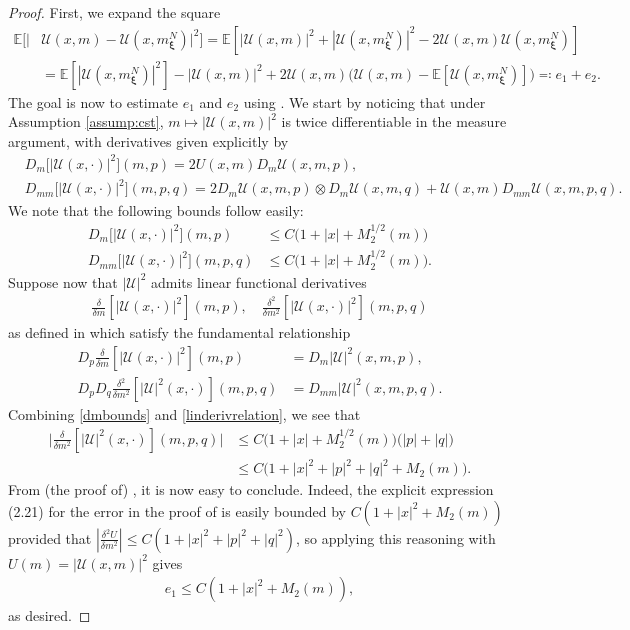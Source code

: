\documentclass[11pt,reqno]{amsart}
\numberwithin{equation}{section}
\theoremstyle{definition}
\def\E{{\mathbb E}}
\newcommand\cU{\mathcal U}
\def \E{\mathbb{E}}
\begin{document}
\begin{proof}
First, we expand the square
\begin{align*}
\E[|& \cU(x,m) - \cU(x,m_{\bm \xi}^N)|^2] = \E[ |\cU(x,m)|^2 + |\cU(x,m_{\bm \xi}^N)|^2 - 2 \cU(x,m) \cU(x,m_{\bm \xi}^N) ] \\
&=  \E[|\cU(x, m_{\bm \xi}^N)|^2] - | \cU(x,m)|^2 + 2\cU(x,m) \big(\cU(x,m) - \E[\cU(x,m_{\bm \xi}^N)] \big) \eqqcolon e_1 + e_2.
\end{align*}
The goal is now to estimate $e_1$ and $e_2$ using \cite[Theorem 2.11]{CST}. 
We start by noticing that under Assumption \ref{assump:cst}, $m \mapsto |\cU(x,m)|^2$ is twice differentiable in the measure argument, with derivatives given explicitly by
\begin{align} \label{derivsquare}
&D_m \big[ |\cU(x,\cdot)|^2\big] (m,p) = 2 U(x,m) D_m \cU(x,m,p), \nonumber \\
&D_{mm} \big[ |\cU(x,\cdot)|^2 \big] (m,p,q) = 2 D_m \cU(x,m,p) \otimes D_m \cU(x,m,q) + \cU(x,m) D_{mm} \cU(x, m,p,q). 
\end{align}
We note that the following bounds follow easily:
\begin{align} \label{dmbounds}
D_m \big[ |\cU(x,\cdot)|^2\big] (m,p) &\leq C\big(1 + |x| + M_2^{1/2}(m)\big) \nonumber \\
D_{mm} \big[ | \cU(x,\cdot)|^2 \big] (m,p,q) &\leq C\big(1 + |x| + M_2^{1/2}(m)\big).
\end{align}
 Suppose now that $|\cU|^2$ admits linear functional derivatives
\begin{align*}
\frac{\delta}{\delta m}[|\cU(x, \cdot)|^2](m,p), \quad \frac{\delta^2}{\delta m^2}[| \cU(x, \cdot)|^2](m,p,q)
\end{align*}
as defined in \cite{CST} which satisfy the fundamental relationship
\begin{align} \label{linderivrelation}
D_p \frac{\delta}{\delta m}[|\cU(x, \cdot)|^2](m,p) &= D_m |\cU|^2(x,m,p), \nonumber \\
D_p D_q \frac{\delta^2}{\delta m^2}[|\cU|^2(x, \cdot)](m,p,q) &= D_{mm} |\cU|^2(x,m,p,q).
\end{align}
Combining \eqref{dmbounds} and \eqref{linderivrelation}, we see that
\begin{align*}
\Big|\frac{\delta}{\delta m^2}[|\cU|^2(x, \cdot)](m,p,q) \Big| &\leq C\big(1 + |x| + M^{1/2}_2(m)\big)\big( |p| +|q| \big) \\
&\leq C\big(1 + |x|^2 + |p|^2 + |q|^2 + M_2(m)\big). 
\end{align*}
From (the proof of) \cite[Theorem 2.11]{CST}, it is now easy to conclude. Indeed, the explicit expression (2.21) for the error in the proof of \cite[Theorem 2.11]{CST} is easily bounded by $C(1 + |x|^2 + M_2(m))$ provided that $|\frac{\delta^2U}{\delta m^2}| \leq C(1 + |x|^2 + |p|^2 + |q|^2)$, so applying this reasoning with $U(m) = |\cU(x,m)|^2$ gives 
\begin{align*}
e_1 \leq C(1 + |x|^2 + M_2(m)),
\end{align*}
as desired. 


\end{proof}
\end{document}
